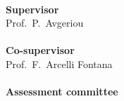 \clearpage
\thispagestyle{empty}
\noindent
\\
\textbf{Supervisor}\\
Prof.\ P.\ Avgeriou\\

\noindent
\\
\textbf{Co-supervisor}\\
Prof.\ F.\ Arcelli Fontana\\

\noindent
\\
\textbf{Assessment committee}\\

\vfill
\normalsize
